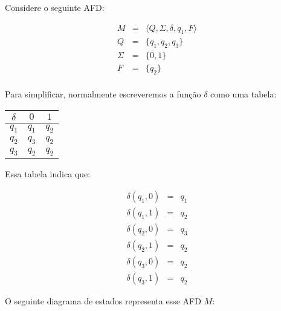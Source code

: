 \begin{example}
  Considere o seguinte AFD:


  \begin{eqnarray*}
    M & = & \langle Q, \Sigma, \delta, q_1, F \rangle\\
    Q & = & \{q_1, q_2, q_3\}\\
    \Sigma & = & \{0,1\}\\
    F & = & \{q_2\}\\
  \end{eqnarray*}

  Para simplificar, normalmente escreveremos a função $\delta$ como uma tabela:

  \begin{center}
  \begin{tabular}{c|cc}
    $\delta$ & $0$ & $1$ \\
    \hline
    $q_1$ & $q_1$ & $q_2$\\
    $q_2$ & $q_3$ & $q_2$\\
    $q_3$ & $q_2$ & $q_2$\\
  \end{tabular}
  \end{center}

Essa tabela indica que:

\begin{eqnarray*}
  \delta(q_1, 0) & = & q_1\\
  \delta(q_1, 1) & = & q_2\\
  \delta(q_2, 0) & = & q_3\\
  \delta(q_2, 1) & = & q_2\\
  \delta(q_3, 0) & = & q_2\\
  \delta(q_3, 1) & = & q_2
\end{eqnarray*}

O seguinte diagrama de estados representa esse AFD $M$:

\begin{center}
\end{center}
\end{example}

